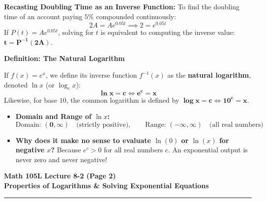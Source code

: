 \documentclass[10.5pt]{article}
\begin{document}
\vspace{0.02in}

\textbf{Recasting Doubling Time as an Inverse Function:}
To find the doubling time of an account paying $5\%$ compounded continuously:
\[
  2A = A e^{0.05t} \implies 2 = e^{0.05t}
\]
If $P(t) = A e^{0.05t}$, solving for $t$ is equivalent to computing the inverse value: $\mathbf{t = P^{-1}(2A)}$.

\vspace{0.03in}

\begin{tcolorbox}[colback=chalkblue!6, colframe=chalkblue, boxrule=1pt, arc=3pt, left=8pt, right=8pt, top=4pt, bottom=4pt]
\textbf{\large Definition: The Natural Logarithm}
\vspace{1pt}

If $f(x) = e^x$, we define its inverse function $f^{-1}(x)$ as the \textbf{natural logarithm}, denoted $\ln x$ (or $\log_e x$):
\[
  \mathbf{\ln x = c \iff e^c = x}
\]
Likewise, for base $10$, the common logarithm is defined by $\mathbf{\log x = c \iff 10^c = x}$.
\end{tcolorbox}

\vspace{0.02in}

\begin{itemize}[leftmargin=1.2em, topsep=1pt, itemsep=2pt]
  \item \textbf{Domain and Range of $\ln x$:}
  \[
    \text{Domain: } \mathbf{(0, \infty)} \quad \text{(strictly positive)}, \qquad \text{Range: } \mathbf{(-\infty, \infty)} \quad \text{(all real numbers)}
  \]
  \item \textbf{Why does it make no sense to evaluate $\ln(0)$ or $\ln(x)$ for negative $x$?}
  Because $e^c > 0$ for all real numbers $c$. An exponential output is never zero and never negative!
\end{itemize}

\newpage

\noindent \textbf{\large Math 105L} \hfill \textbf{\large Lecture 8-2 (Page 2)}\\[1pt]
{\textbf{\Large Properties of Logarithms \& Solving Exponential Equations}}\\[-5pt]
\rule{\textwidth}{1.2pt}

\vspace{0.03in}
\end{document}
